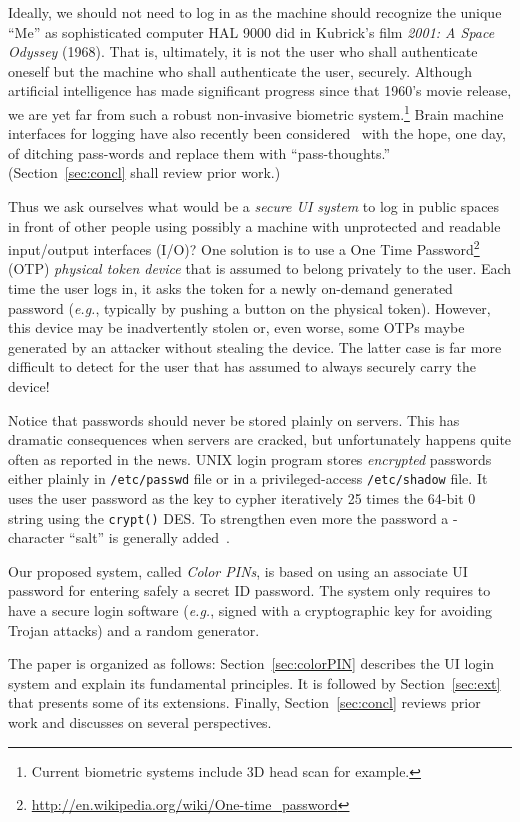 \documentclass[12pt,onecolumn]{article}
\begin{document}
Ideally, we should not need to log in as the machine should recognize the unique ``Me'' as sophisticated computer HAL 9000 did in Kubrick's film {\it 2001: A Space Odyssey} (1968). That is, ultimately, it is not the user who shall authenticate oneself but the machine who shall authenticate the user, securely.
Although artificial intelligence has made significant progress since that 1960's movie release, we are yet far from such a robust non-invasive biometric system.\footnote{Current biometric systems include 3D head scan for example.} 
Brain machine interfaces  for logging have also recently been considered~\cite{Passthoughts-2013} with the hope, one day, of ditching pass-words and replace them with ``pass-thoughts.'' (Section~\ref{sec:concl} shall review prior work.)
 
Thus we ask ourselves what would be a {\em secure UI system} to log in public spaces in front of other people using possibly a machine with unprotected and readable input/output interfaces (I/O)? 
One solution is to use a One Time Password\footnote{\url{http://en.wikipedia.org/wiki/One-time_password}} (OTP) {\em physical token device} that is assumed to belong privately to the user. Each time the user logs in, it asks the token for a newly on-demand generated password ({\it e.g.}, typically by pushing a button on the physical token).
However, this device may be inadvertently stolen or, even worse, some OTPs  maybe generated by an attacker without stealing the device.
The latter case is far more difficult to detect for the user that has assumed to always securely carry the device!

Notice that passwords should never be stored plainly on servers. This has dramatic consequences when servers are cracked, but unfortunately happens quite often as reported in the news.
UNIX login program stores {\em encrypted} passwords either plainly in {\tt /etc/passwd} file or in a privileged-access {\tt /etc/shadow} file.
It uses the user password as the key to cypher iteratively 25 times the 64-bit 0 string using the {\tt crypt()} DES.
To strengthen even more the password a -character ``salt'' is generally added~\cite{Salt-2000}.
 
Our proposed system, called {\em Color PINs}, is based on using an associate UI password for entering safely a secret ID password.
The system only requires to have a secure login software ({\it e.g.}, signed with a cryptographic key for avoiding Trojan attacks) and a random generator.
 
The paper is organized as follows: 
Section~\ref{sec:colorPIN} describes the   UI login system and explain its fundamental principles.
It is followed by Section~\ref{sec:ext} that presents some of its extensions.
Finally, Section~\ref{sec:concl} reviews prior work and discusses on several perspectives.
\end{document}
